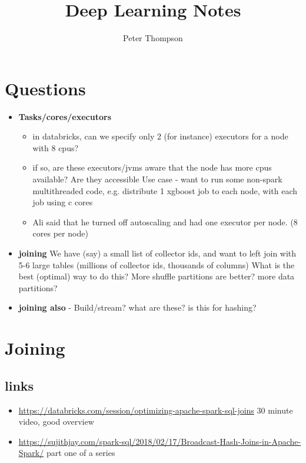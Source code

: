 \documentclass{article}
\title{Deep Learning Notes}
\author{Peter Thompson}
\begin{document}
\section{Questions}
\begin{itemize}
    \item {\bf Tasks/cores/executors}
    \begin{itemize}
        \item in databricks, can we specify only 2 (for instance) executors for a node with 8 cpus?
        \item if so, are these executors/jvms aware that the node has more cpus available? Are they accessible
        Use case - want to run some non-spark multithreaded code, e.g. distribute 1 xgboost job to each node, with each job using c cores
        \item Ali said that he turned off autoscaling and had one executor per node. (8 cores per node)
    \end{itemize}
    \item {\bf joining} 
        We have (say) a small list of collector ids, and want to left join with 5-6 large tables (millions of collector ids, thousands of columns)
        What is the best (optimal) way to do this? More shuffle partitions are better? more data partitions?  
    \item {\bf joining also} - Build/stream? what are these? is this for hashing?

    \end{itemize}

\section{Joining}
    \subsection{links}
    \begin{itemize}
        \item \url{https://databricks.com/session/optimizing-apache-spark-sql-joins} 30 minute video, good overview
        \item \url{https://sujithjay.com/spark-sql/2018/02/17/Broadcast-Hash-Joins-in-Apache-Spark/} part one of a series
    \end{itemize}
\end{document}
